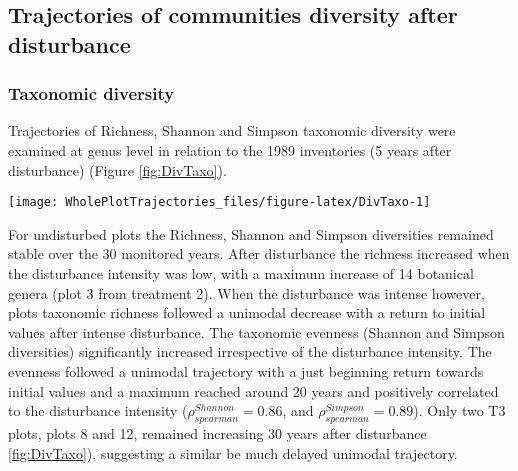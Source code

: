 \documentclass[fleqn,10pt]{ArtEcoFoG} %
\theoremstyle{definition}
\theoremstyle{definition}
\theoremstyle{definition}
\theoremstyle{remark}
\begin{document}
\subsection{Trajectories of communities diversity after
disturbance}\label{trajectories-of-communities-diversity-after-disturbance}

\subsubsection{Taxonomic diversity}\label{taxonomic-diversity}

Trajectories of Richness, Shannon and Simpson taxonomic diversity were
examined at genus level in relation to the 1989 inventories (5 years
after disturbance) (Figure \ref{fig:DivTaxo}).

\begin{figure*}

{\centering \texttt{[image: WholePlotTrajectories\_files/figure-latex/DivTaxo-1]} 

}

\caption{Trajectories of the difference to the 1989 inventories (5 years after disturbance) over 30 years after disturbance of plots communities \textbf{(a)} Richness, \textbf{(b)} Shannon and \textbf{(c)} Simpson diversities. Trajectories correspond to the median (solid line) and 0.025 and 0.975 percentile (gray envelope) observed after 50 iteration of the taxonomic uncertainty propagation. Initial treatments are represented by solid lines colors with green for control, blue for T1,orange for T2 and red for T3.}\label{fig:DivTaxo}
\end{figure*}

For undisturbed plots the Richness, Shannon and Simpson diversities
remained stable over the 30 monitored years. After disturbance the
richness increased when the disturbance intensity was low, with a
maximum increase of 14 botanical genera (plot 3 from treatment 2). When
the disturbance was intense however, plots taxonomic richness followed a
unimodal decrease with a return to initial values after intense
disturbance. The taxonomic evenness (Shannon and Simpson diversities)
significantly increased irrespective of the disturbance intensity. The
evenness followed a unimodal trajectory with a just beginning return
towards initial values and a maximum reached around 20 years and
positively correlated to the disturbance intensity
(\(\rho_{spearman}^{Shannon}=0.86\), and
\(\rho_{spearman}^{Simpson}=0.89\)). Only two T3 plots, plots 8 and 12,
remained increasing 30 years after disturbance \ref{fig:DivTaxo}),
suggesting a similar be much delayed unimodal trajectory.
\end{document}
